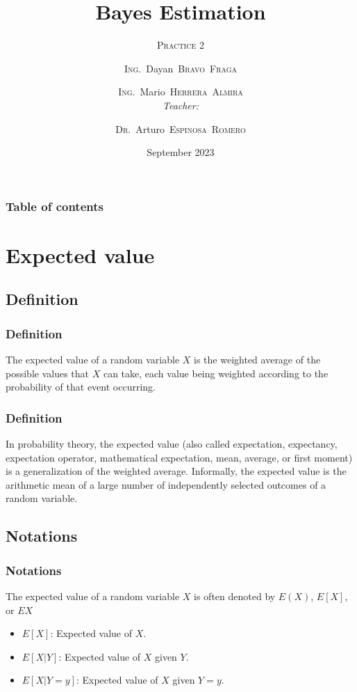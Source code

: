 \documentclass{beamer}
\title{Bayes Estimation}
\subtitle{\textsc{Practice 2}}
\author[Dayan \& Mario]
{
    \authorcr\textsc{Ing.}~Dayan~\textsc{Bravo~Fraga}\inst{1}\\
    \and
    \authorcr\textsc{Ing.}~Mario~\textsc{Herrera~Almira}\inst{2}\\
    \vspace{.5cm}
    \emph{Teacher:}\\
    \and
    \authorcr\textsc{Dr.}~Arturo~\textsc{Espinosa~Romero}\inst{3}\\
}
\institute[UADY]{
    \begin{center}
        \textbf{MCC}\\
        \textbf{Facultad de Matemáticas}\\
        \textbf{Universidad Autónoma de Yucatán}\\
    \end{center}
}
\date[September 2023]{September 2023}
\begin{document}
    \begin{frame}
        \label{frm:titlepage}
        \titlepage
    \end{frame}

    \begin{frame}
        \frametitle{Table of contents}
        \tableofcontents
    \end{frame}


    \section{Expected value}\label{sec:expected_value}

    \subsection{Definition}\label{subsec:definition}
    \begin{frame}
        \frametitle{Definition}
        \begin{block}{}
            The expected value of a random variable $X$ is the weighted average of the possible values that $X$ can take, each value being weighted according to the probability of that event occurring.
        \end{block}
    \end{frame}
    \begin{frame}
        \frametitle{Definition}
        \begin{block}{}
            In probability theory, the expected value (also called expectation, expectancy, expectation operator, mathematical expectation, mean, average, or first moment) is a generalization of the weighted average.
            Informally, the expected value is the arithmetic mean of a large number of independently selected outcomes of a random variable.
        \end{block}
    \end{frame}

    \subsection{Notations}\label{subsec:notations}
    \begin{frame}
        \frametitle{Notations}
        \begin{block}{}
            The expected value of a random variable $X$ is often denoted by $E(X)$, $E[X]$, or $EX$
        \end{block}
        \begin{block}{}
            \begin{itemize}
                \item $E[X]$: Expected value of $X$.
                \item $E[X|Y]$: Expected value of $X$ given $Y$.
                \item $E[X|Y=y]$: Expected value of $X$ given $Y=y$.
            \end{itemize}
        \end{block}
    \end{frame}
\end{document}
